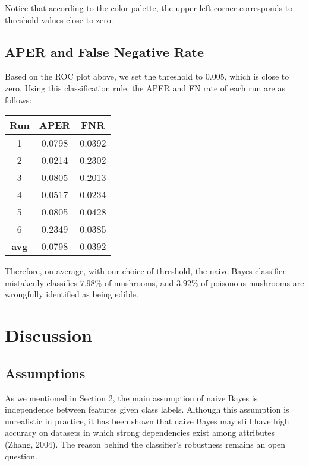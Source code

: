 \documentclass{article}
\begin{document}
\begin{multicols}{2}
Notice that according to the color palette, the upper left corner corresponds to threshold values close to zero.

\subsection{APER and False Negative Rate}
Based on the ROC plot above, we set the threshold to 0.005, which is close to zero. Using this classification rule, the APER and FN rate of each run are as follows:\\

\begin{center}
\begin{tabular}{|c|c|c|}
\hline
\textbf{Run} & \textbf{APER} & \textbf{FNR}\\
\hline
1 & 0.0798 & 0.0392\\\hline
2 & 0.0214 & 0.2302\\\hline
3 & 0.0805 & 0.2013\\\hline
4 & 0.0517 & 0.0234\\\hline
5 & 0.0805 & 0.0428\\\hline
6 & 0.2349 & 0.0385\\\hline\hline
\textbf{avg} & 0.0798 & 0.0392\\
\hline
\end{tabular}
\end{center}

Therefore, on average, with our choice of threshold, the naive Bayes classifier mistakenly classifies $7.98\%$ of mushrooms, and $3.92\%$ of poisonous mushrooms are wrongfully identified as being edible.






\section{Discussion}
\subsection{Assumptions}
As we mentioned in Section 2, the main assumption of naive Bayes is independence between features given class labels. Although this assumption is unrealistic in practice, it has been shown that naive Bayes may still have high accuracy on datasets in which strong dependencies exist among attributes (Zhang, 2004). The reason behind the classifier's robustness remains an open question.

\end{multicols}
\end{document}
